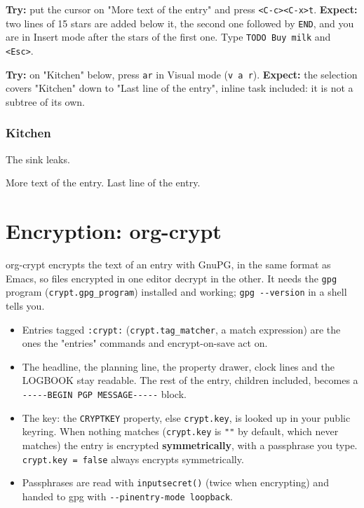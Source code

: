 \textbf{Try:} put the cursor on "More text of the entry" and press \texttt{<C-c><C-x>t}.
\textbf{Expect:} two lines of 15 stars are added below it, the second one
followed by \texttt{END}, and you are in Insert mode after the stars of the
first one. Type \texttt{TODO Buy milk} and \texttt{<Esc>}.

\textbf{Try:} on "Kitchen" below, press \texttt{ar} in Visual mode (\texttt{v a r}).
\textbf{Expect:} the selection covers "Kitchen" down to "Last line of the
entry", inline task included: it is not a subtree of its own.
\subsubsection{Kitchen}
\label{sec:orgf7915eb}
The sink leaks.
\begin{center}
\end{center}
More text of the entry.
Last line of the entry.
\section{Encryption: org-crypt}
\label{sec:org84cb207}
org-crypt encrypts the text of an entry with GnuPG, in the same format as
Emacs, so files encrypted in one editor decrypt in the other. It needs the
\texttt{gpg} program (\texttt{crypt.gpg\_program}) installed and working; \texttt{gpg -{}-{}version}
in a shell tells you.

\begin{itemize}
\item Entries tagged \texttt{:crypt:} (\texttt{crypt.tag\_matcher}, a match expression) are
the ones the "entries" commands and encrypt-on-save act on.
\item The headline, the planning line, the property drawer, clock lines and
the LOGBOOK stay readable. The rest of the entry, children included,
becomes a \texttt{-{}-{}-{}-{}-BEGIN PGP MESSAGE-{}-{}-{}-{}-} block.
\item The key: the \texttt{CRYPTKEY} property, else \texttt{crypt.key}, is looked up in your
public keyring. When nothing matches (\texttt{crypt.key} is \texttt{""} by default,
which never matches) the entry is encrypted \textbf{symmetrically}, with a
passphrase you type. \texttt{crypt.key = false} always encrypts
symmetrically.
\item Passphrases are read with \texttt{inputsecret()} (twice when encrypting) and
handed to gpg with \texttt{-{}-{}pinentry-mode loopback}.
\end{itemize}


